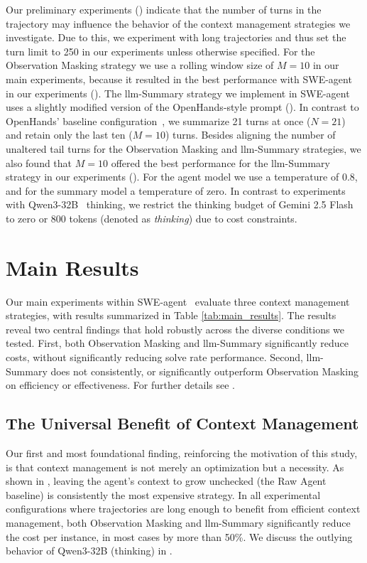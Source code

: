 \documentclass{article}
\begin{document}
Our preliminary experiments () indicate that the number of turns in the trajectory may influence the behavior of the context management strategies we investigate. Due to this, we experiment with long trajectories and thus set the turn limit to 250 in our experiments unless otherwise specified. For the Observation Masking strategy we use a rolling window size of $M=10$ in our main experiments, because it resulted in the best performance with SWE-agent~\cite{yang_swe-agent_2024} in our experiments (). The \ac{llm}-Summary strategy we implement in SWE-agent~\cite{yang_swe-agent_2024} uses a slightly modified version of the OpenHands-style prompt (). In contrast to OpenHands' baseline configuration~\cite{wang2025openhands}, we summarize 21 turns at once ($N=21$) and retain only the last ten ($M=10$) turns. Besides aligning the number of unaltered tail turns for the Observation Masking and \ac{llm}-Summary strategies, we also found that $M=10$ offered the best performance for the \ac{llm}-Summary strategy in our experiments (). For the agent model we use a temperature of 0.8, and for the summary model a temperature of zero. In contrast to experiments with Qwen3-32B~\cite{qwen3technicalreport} thinking, we restrict the thinking budget of Gemini 2.5 Flash to zero or 800 tokens (denoted as \textit{thinking}) due to cost constraints. 

\section{Main Results}
\label{sec:main-results}
Our main experiments within SWE-agent~\cite{yang_swe-agent_2024} evaluate three context management strategies, with results summarized in Table \ref{tab:main_results}. The results reveal two central findings that hold robustly across the diverse conditions we tested. First, both Observation Masking and \ac{llm}-Summary significantly reduce costs, without significantly reducing solve rate performance. Second, \ac{llm}-Summary does not consistently, or significantly outperform Observation Masking on efficiency or effectiveness. For further details see .

\subsection{The Universal Benefit of Context Management}
\label{subsec:universal-benefit}
Our first and most foundational finding, reinforcing the motivation of this study, is that context management is not merely an optimization but a necessity. As shown in , leaving the agent's context to grow unchecked (the Raw Agent baseline) is consistently the most expensive strategy. In all experimental configurations where trajectories are long enough to benefit from efficient context management, both Observation Masking and \ac{llm}-Summary significantly reduce the cost per instance, in most cases by more than 50\%. We discuss the outlying behavior of Qwen3-32B (thinking) in .
\end{document}
